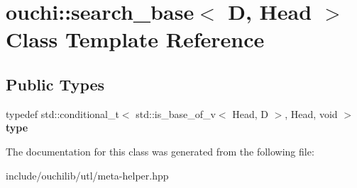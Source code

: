 \hypertarget{classouchi_1_1search__base_3_01_d_00_01_head_01_4}{}\section{ouchi\+::search\+\_\+base$<$ D, Head $>$ Class Template Reference}
\label{classouchi_1_1search__base_3_01_d_00_01_head_01_4}
\subsection*{Public Types}
\begin{DoxyCompactItemize}
\item 
\mbox{\label{classouchi_1_1search__base_3_01_d_00_01_head_01_4_a28faa64138dc6fb45b78e77ecb23bc1a}} 
typedef std\+::conditional\+\_\+t$<$ std\+::is\+\_\+base\+\_\+of\+\_\+v$<$ Head, D $>$, Head, void $>$ {\bfseries type}
\end{DoxyCompactItemize}


The documentation for this class was generated from the following file\+:\begin{DoxyCompactItemize}
\item 
include/ouchilib/utl/meta-\/helper.\+hpp\end{DoxyCompactItemize}
